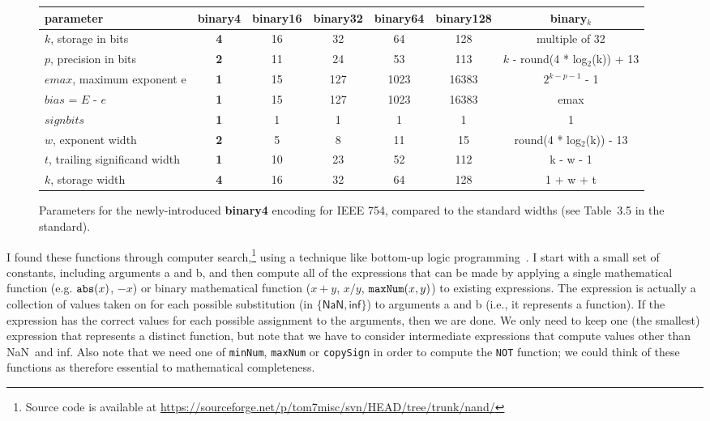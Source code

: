 \documentclass[twocolumn,cm]{article}
\newcommand\nan{\textsf{NaN}}
\renewcommand\inf{\textsf{inf}}
\begin{document}
\begin{figure}[tp]
\begin{tabular}{|l|c|c|c|c|c|c|}
  \hline
  parameter & {\bf binary4} & binary16 & binary32 & binary64 & binary128 & binary$_k$ \\
  \hline
  $k$, storage in bits & {\bf 4} & 16 & 32 & 64 & 128 & multiple of 32 \\
  $p$, precision in bits & {\bf 2} & 11 & 24 & 53 & 113 & $k$ - round(4 * log$_2$(k)) + 13 \\
  $emax$, maximum exponent e & {\bf 1} & 15 & 127 & 1023 & 16383 & $2^{k-p-1}$ - 1 \\
  $bias$ = $E$ - $e$ & {\bf 1} & 15 & 127 & 1023 & 16383 & emax \\
  $sign bits$ & {\bf 1} & 1 & 1 & 1 & 1 & 1 \\
  $w$, exponent width & {\bf 2} & 5 & 8 & 11 & 15 & round(4 * log$_2$(k)) - 13 \\
  $t$, trailing significand width & {\bf 1} & 10 & 23 & 52 & 112 & k - w - 1 \\
  $k$, storage width & {\bf 4} & 16 & 32 & 64 & 128 & 1 + w + t \\
\hline
\end{tabular}
\caption{Parameters for the newly-introduced {\bf binary4} encoding
  for IEEE 754, compared to the standard widths (see Table~3.5 in the
  standard\cite{ieee754}). } \label{fig:binary4}
\end{figure}

I found these functions through computer search,\footnote{
  Source code is available at \url{https://sourceforge.net/p/tom7misc/svn/HEAD/tree/trunk/nand/}
  } using a technique
like bottom-up logic programming~\cite{pfenning2006logic}. I start
with a small set of constants, including arguments {\sf a} and {\sf
  b}, and then compute all of the expressions that can be made by
applying a single mathematical function (e.g. ${\tt abs}(x)$, $-x$) or
binary mathematical function ($x + y$, $x / y$, ${\tt maxNum}(x, y)$)
to existing expressions. The expression is actually a collection of
values taken on for each possible substitution (in $\{\nan, \inf\}$)
to arguments {\sf a} and {\sf b} (i.e., it represents a function). If
the expression has the correct values for each possible assignment to
the arguments, then we are done. We only need to keep one (the
smallest) expression that represents a distinct function, but note
that we have to consider intermediate expressions that compute values
other than \nan\ and \inf. Also note that we need one of {\tt minNum},
{\tt maxNum} or {\tt copySign} in order to compute the {\tt NOT}
function; we could think of these functions as therefore essential
to mathematical completeness.
\end{document}
